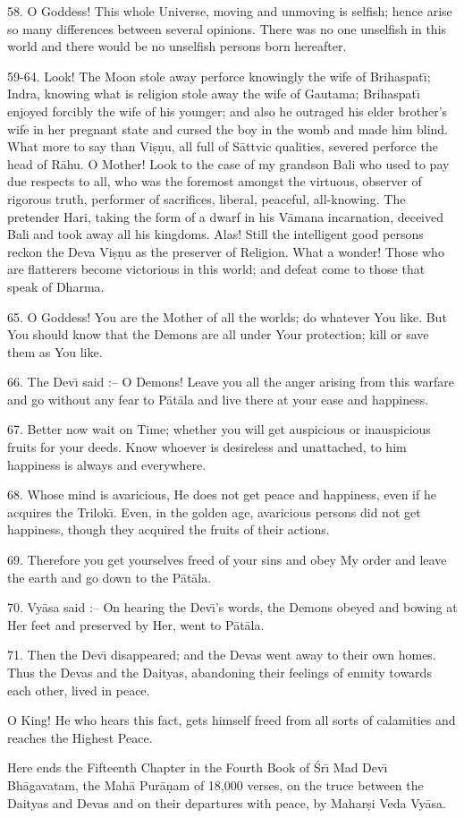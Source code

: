 58. O Goddess! This whole Universe, moving and unmoving is selfish; hence arise so many differences between several opinions. There was no one unselfish in this world and there would be no unselfish persons born hereafter.

59-64. Look! The Moon stole away perforce knowingly the wife of Brihaspat\={\i}; Indra, knowing what is religion stole away the wife of Gautama; Brihaspat\={\i} enjoyed forcibly the wife of his younger; and also he outraged his elder brother's wife in her pregnant state and cursed the boy in the womb and
made him blind. What more to say than Vi\d{s}\d{n}u, all full of S\=attvic qualities, severed perforce the head of R\=ahu. O Mother! Look to the case of my grandson Bali who used to pay due respects to all, who was the foremost amongst the virtuous, observer of rigorous truth, performer of sacrifices, liberal, peaceful, all-knowing. The pretender Hari, taking the form of a dwarf in his V\=amana incarnation, deceived Bali and took away all his kingdoms. Alas! Still the intelligent good persons reckon the Deva Vi\d{s}\d{n}u as the preserver of Religion. What a wonder! Those who are flatterers become victorious in this world; and defeat come to those that speak of Dharma.

65. O Goddess! You are the Mother of all the worlds; do whatever You like. But You should know that the Demons are all under Your protection; kill or save them as You like.

66. The Dev\={\i} said :-- O Demons! Leave you all the anger arising from this warfare and go without any fear to P\=at\=ala and live there at your ease and happiness.

67. Better now wait on Time; whether you will get auspicious or inauspicious fruits for your deeds. Know whoever is desireless and unattached, to him happiness is always and everywhere.

68. Whose mind is avaricious, He does not get peace and happiness, even if he acquires the Trilok\={\i}. Even, in the golden age, avaricious persons did not get happiness, though they acquired the fruits of their actions.

69. Therefore you get yourselves freed of your sins and obey My order and leave the earth and go down to the P\=at\=ala.

70. Vy\=asa said :-- On hearing the Dev\={\i}'s words, the Demons obeyed and bowing at Her feet and preserved by Her, went to P\=at\=ala.

71. Then the Dev\={\i} disappeared; and the Devas went away to their own homes. Thus the Devas and the Daityas, abandoning their feelings of enmity towards each other, lived in peace.

O King! He who hears this fact, gets himself freed from all sorts of calamities and reaches the Highest Peace.

Here ends the Fifteenth Chapter in the Fourth Book of \'Sr\={\i} Mad Dev\={\i} Bh\=agavatam, the Mah\=a Pur\=a\d{n}am of 18,000 verses, on the truce between the Daityas and Devas and on their departures with peace, by Mahar\d{s}i Veda Vy\=asa.



